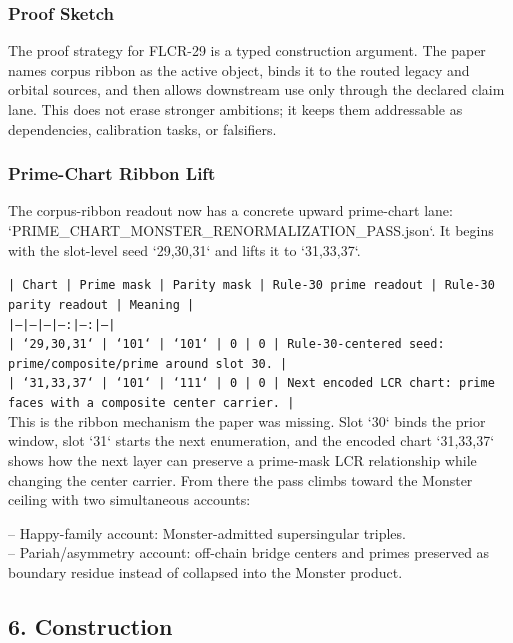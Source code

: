 \documentclass[11pt]{article}
\begin{document}
\subsubsection*{Proof Sketch}

The proof strategy for FLCR-29 is a typed construction argument. The paper names corpus ribbon as the active object, binds it to the routed legacy and orbital sources, and then allows downstream use only through the declared claim lane. This does not erase stronger ambitions; it keeps them addressable as dependencies, calibration tasks, or falsifiers.

\subsubsection*{Prime-Chart Ribbon Lift}

The corpus-ribbon readout now has a concrete upward prime-chart lane:
`PRIME\_CHART\_MONSTER\_RENORMALIZATION\_PASS.json`. It begins with the slot-level
seed `29,30,31` and lifts it to `31,33,37`.

\noindent\texttt{| Chart | Prime mask | Parity mask | Rule-30 prime readout | Rule-30 parity readout | Meaning |}\\
\noindent\texttt{|---|---|---|---:|---:|---|}\\
\noindent\texttt{| `29,30,31` | `101` | `101` | 0 | 0 | Rule-30-centered seed: prime/composite/prime around slot 30. |}\\
\noindent\texttt{| `31,33,37` | `101` | `111` | 0 | 0 | Next encoded LCR chart: prime faces with a composite center carrier. |}\\

This is the ribbon mechanism the paper was missing. Slot `30` binds the prior
window, slot `31` starts the next enumeration, and the encoded chart
`31,33,37` shows how the next layer can preserve a prime-mask LCR relationship
while changing the center carrier. From there the pass climbs toward the
Monster ceiling with two simultaneous accounts:

\noindent{}-- Happy-family account: Monster-admitted supersingular triples.\\
\noindent{}-- Pariah/asymmetry account: off-chain bridge centers and primes preserved as\\
  boundary residue instead of collapsed into the Monster product.

\subsection*{6. Construction}
\end{document}
